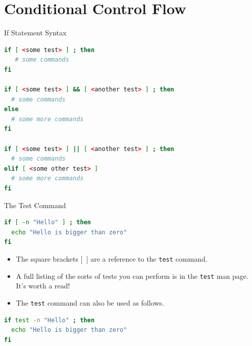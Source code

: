 \documentclass[11pt]{beamer}
\begin{document}
\section[Conditionals]{Conditional Control Flow}
\begin{frame}[fragile=singleslide]{If Statement Syntax}
\begin{lstlisting}[style=terminal, language=bash]
if [ <some test> ] ; then
   # some commands
fi

if [ <some test> ] && [ <another test> ] ; then
  # some commands
else 
  # some more commands
fi

if [ <some test> ] || [ <another test> ] ; then
  # some commands
elif [ <some other test> ]
  # some more commands
fi
\end{lstlisting}
\end{frame}

\begin{frame}[fragile=singleslide]{The Test Command}
\begin{lstlisting}[style=terminal, language=bash]
if [ -n "Hello" ] ; then
  echo "Hello is bigger than zero"
fi
\end{lstlisting}
\begin{itemize}
\item The square brackets \texttt{$[$ $]$} are a reference to the \texttt{test} command.
\item A full listing of the sorts of tests you can perform is in the \texttt{test} man page.  It's worth a read! 
\item The \texttt{test} command can also be used as follows.
\end{itemize}
\begin{lstlisting}[style=terminal, language=bash]
if test -n "Hello" ; then
  echo "Hello is bigger than zero"
fi
\end{lstlisting}
\end{frame}
\end{document}
